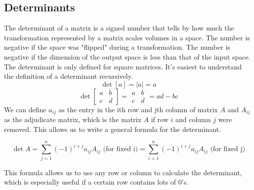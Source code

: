 \subsection{Determinants}
\noindent
The determinant of a matrix is a signed number that tells by how much the transformation represented by a matrix scales volumes in a space. The number is negative if the space was "flipped" during a transformation. The number is negative if the dimension of the output space is less than that of the input space.\\

\noindent
The determinant is only defined for square matrices. It's easiest to understand the definition of a determinant recursively.
\begin{equation*}
	\det{\left[ a \right]} = \lvert a \rvert = a
\end{equation*}
\begin{equation*}
	\det{\left[
		\begin{array}{cc}
			a & b \\
			c & d
		\end{array}
	\right]} = \begin{array}{|cc|}
		a & b \\
		c & d
	\end{array} = ad - bc
\end{equation*}
We can define $a_{ij}$ as the entry in the ith row and jth column of matrix $A$ and $A_{ij}$ as the adjudicate matrix, which is the matrix $A$ if row $i$ and column $j$ were removed. This allows us to write a general formula for the determinant.
\begin{definition}
	\begin{equation*}
		\det{A} = \sum_{j=1}^{n}{\left(-1\right)^{i+j}a_{ij}A_{ij}} \text{ (for fixed i)} = \sum_{i=1}^{n}{\left(-1\right)^{i+j}a_{ij}A_{ij}} \text{ (for fixed j)}
	\end{equation*}
\end{definition}
\noindent
This formula allows us to use any row or column to calculate the determinant, which is especially useful if a certain row contains lots of 0's.\\

